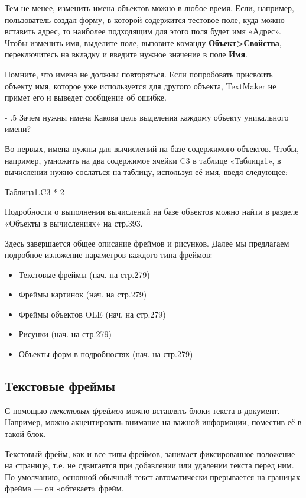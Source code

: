 \documentclass[a4paper,10pt]{article}
\makeatletter
\renewcommand\paragraph{%
   \@startsection{paragraph}{4}{0mm}%
      {-\baselineskip}%
      {.5\baselineskip}%
      {\normalfont\normalsize\bfseries}}
\makeatother
\begin{document}
Тем не менее, изменить имена объектов можно в любое время. Если, например, пользователь создал форму, в которой содержится тестовое поле, куда можно вставить адрес, то наиболее подходящим для этого поля будет имя «Адрес». Чтобы изменить имя, выделите поле, вызовите команду \textbf{Объект>Свойства}, переключитесь на вкладку и введите нужное значение в поле \textbf{Имя}.

Помните, что имена не должны повторяться. Если попробовать присвоить объекту имя, которое уже используется для другого объекта, TextMaker не примет его и выведет сообщение об ошибке.

\paragraph{Зачем нужны имена}
Какова цель выделения каждому объекту уникального имени? 

Во-первых, имена нужны для вычислений на базе содержимого объектов. Чтобы, например, умножить на два содержимое ячейки C3 в таблице «Таблица1», в вычислении нужно сослаться на таблицу, используя её имя, введя следующее:

Таблица1.C3 * 2

Подробности о выполнении вычислений на базе объектов можно найти в разделе «Объекты в вычислениях» на стр.393.

Здесь завершается общее описание фреймов и рисунков. Далее мы предлагаем подробное изложение параметров каждого типа фреймов:

\begin{itemize}
 \item Текстовые фреймы (нач. на стр.279)
 \item Фреймы картинок (нач. на стр.279)
 \item Фреймы объектов OLE (нач. на стр.279)
 \item Рисунки (нач. на стр.279)
 \item Объекты форм в подробностях (нач. на стр.279)
\end{itemize}

\subsection{Текстовые фреймы}
С помощью \textit{текстовых фреймов} можно вставлять блоки текста в документ. Например, можно акцентировать внимание на важной информации, поместив её в такой блок.

Текстовый фрейм, как и все типы фреймов, занимает фиксированное положение на странице, т.е. не сдвигается при добавлении или удалении текста перед ним. По умолчанию, основной обычный текст автоматически прерывается на границах фрейма --- он «обтекает» фрейм.
\end{document}
